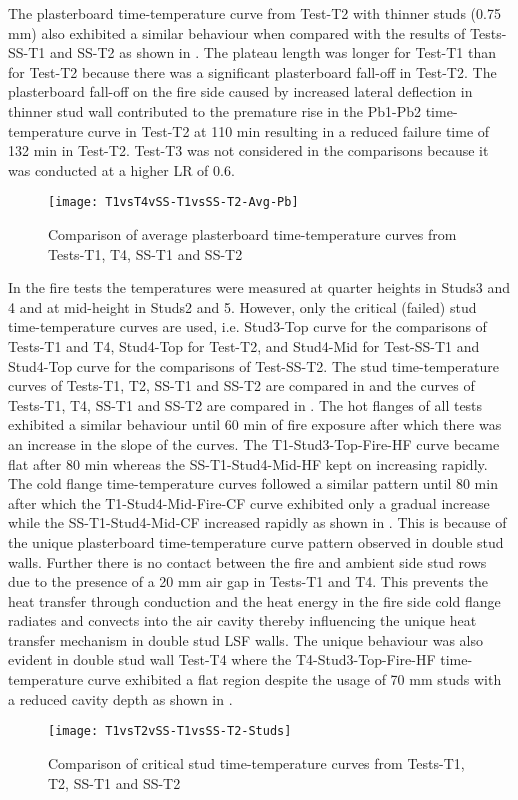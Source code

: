 The plasterboard time-temperature curve from Test-T2 with thinner studs (0.75 mm) also exhibited a similar behaviour when compared with the results of Tests-SS-T1 and SS-T2 as shown in . The plateau length was longer for Test-T1 than for Test-T2 because there was a significant plasterboard fall-off in Test-T2. The plasterboard fall-off on the fire side caused by increased lateral deflection in thinner stud wall contributed to the premature rise in the Pb1-Pb2 time-temperature curve in Test-T2 at 110 min resulting in a reduced failure time of 132 min in Test-T2. Test-T3 was not considered in the comparisons because it was conducted at a higher LR of 0.6. 
\begin{figure}[!htbp]
	\centering
		\texttt{[image: T1vsT4vSS-T1vsSS-T2-Avg-Pb]}  
	\caption{Comparison of average plasterboard time-temperature curves from Tests-T1, T4, SS-T1 and SS-T2}
	\label{fig:T1vsT4vSS-T1vsSS-T2-Avg-Pb}
\end{figure}

In the fire tests the temperatures were measured at quarter heights in Studs3 and 4 and at mid-height in Studs2 and 5. However, only the critical (failed) stud time-temperature curves are used, i.e. Stud3-Top curve for the comparisons of Tests-T1 and T4, Stud4-Top for Test-T2, and Stud4-Mid for Test-SS-T1 and Stud4-Top curve for the comparisons of Test-SS-T2. The stud time-temperature curves of Tests-T1, T2, SS-T1 and SS-T2 are compared in  and the curves of Tests-T1, T4, SS-T1 and SS-T2 are compared in . The hot flanges of all tests exhibited a similar behaviour until 60 min of fire exposure after which there was an increase in the slope of the curves. The T1-Stud3-Top-Fire-HF curve became flat after 80 min whereas the SS-T1-Stud4-Mid-HF kept on increasing rapidly. The cold flange time-temperature curves followed a similar pattern until 80 min after which the T1-Stud4-Mid-Fire-CF curve exhibited only a gradual increase while the SS-T1-Stud4-Mid-CF increased rapidly as shown in . This is because of the unique plasterboard time-temperature curve pattern observed in double stud walls. Further there is no contact between the fire and ambient side stud rows due to the presence of a 20 mm air gap in Tests-T1 and T4. This prevents the heat transfer through conduction and the heat energy in the fire side cold flange radiates and convects into the air cavity thereby influencing the unique heat transfer mechanism in double stud LSF walls. The unique behaviour was also evident in double stud wall Test-T4 where the T4-Stud3-Top-Fire-HF time-temperature curve exhibited a flat region despite the usage of 70 mm studs with a reduced cavity depth as shown in .
\begin{figure}[!htbp]
	\centering
		\texttt{[image: T1vsT2vSS-T1vsSS-T2-Studs]}  
	\caption{Comparison of critical stud time-temperature curves from Tests-T1, T2, SS-T1 and SS-T2}
	\label{fig:T1vsT2vSS-T1vsSS-T2-Studs}
\end{figure}

